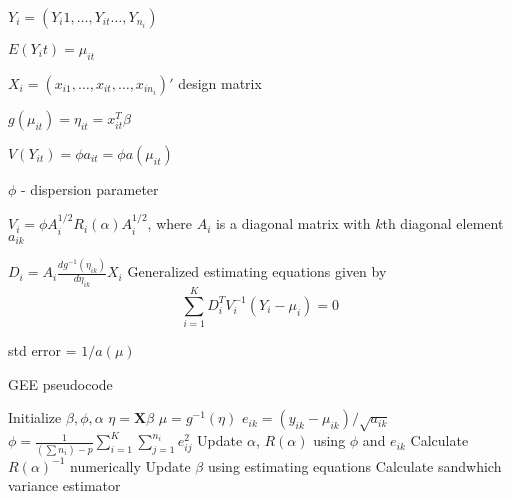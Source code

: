 \documentclass[10pt]{article}
\begin{document}
$Y_i = (Y_i1, \ldots , Y_{it} \ldots , Y_{n_i})$

$E(Y_it) = \mu_{it}$

$X_i = (x_{i1}, \ldots , x_{it}, \ldots, x_{in_i})'$ design matrix


$g(\mu_{it}) = \eta_{it} = x_{it}^T \beta$

$V(Y_{it}) = \phi a_{it} = \phi a(\mu_{it})$

$\phi$ - dispersion parameter


$V_i = \phi A_i^{1/2}R_i(\alpha)A_i^{1/2}$, where $A_i$  is a diagonal matrix with $k$th diagonal element $a_{ik}$


$D_i = A_i \frac{d g^{-1}(\eta_{ik})}{d\eta_{ik}}X_i$
Generalized estimating equations given by
$$\sum_{i=1}^K D_i^T V_i^{-1}(Y_i - \mu_i) = 0 $$

std error = $1/a(\mu)$

\begin{algorithm}
\caption{GEE pseudocode}\label{alg:cap}
\begin{algorithmic}
\State Initialize $\beta,\phi,\alpha$
  \State $\eta = \mathbf{X}\beta$
  \State $\mu = g^{-1}(\eta)$
  \State $e_{ik} = (y_{ik} - \mu_{ik})/\sqrt{a_{ik}}$
  \State $\phi = \frac{1}{(\sum n_i) - p} \sum_{i = 1}^K \sum_{j = 1}^{n_i} e_{ij}^2$
  \State Update $\alpha$, $R(\alpha)$ using $\phi$ and $e_{ik}$
  \State Calculate $R(\alpha)^{-1}$ numerically
  \State Update $\beta$ using estimating equations
\EndWhile
\State Calculate sandwhich variance estimator
\end{algorithmic}
\end{algorithm}
\end{document}
